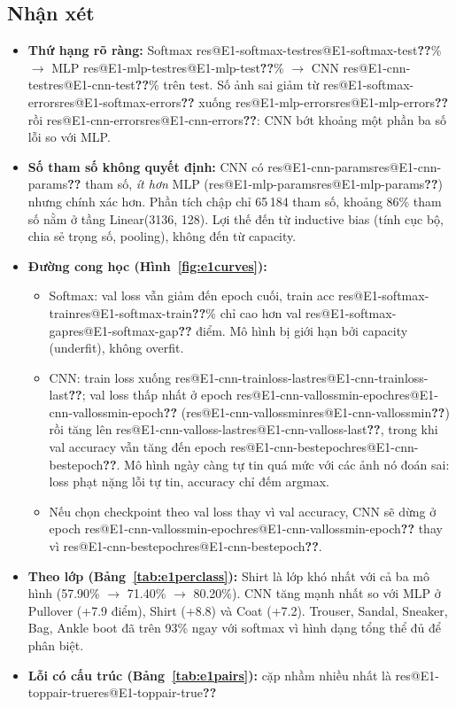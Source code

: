\documentclass[twoside,final]{hcmut-report}
\makeatletter
\newcommand{\res}[1]{\ifcsname res@#1\endcsname\csname res@#1\endcsname\else\textbf{??}\fi}
\makeatother
\begin{document}
\subsection{Nhận xét}
\begin{itemize}
  \item \textbf{Thứ hạng rõ ràng:} Softmax \res{E1-softmax-test}\% $\rightarrow$ MLP \res{E1-mlp-test}\% $\rightarrow$
        CNN \res{E1-cnn-test}\% trên test. Số ảnh sai giảm từ \res{E1-softmax-errors} xuống \res{E1-mlp-errors}
        rồi \res{E1-cnn-errors}: CNN bớt khoảng một phần ba số lỗi so với MLP.
  \item \textbf{Số tham số không quyết định:} CNN có \res{E1-cnn-params} tham số, \emph{ít hơn} MLP
        (\res{E1-mlp-params}) nhưng chính xác hơn. Phần tích chập chỉ 65\,184 tham số, khoảng 86\% tham số nằm ở
        tầng Linear(3136, 128). Lợi thế đến từ inductive bias (tính cục bộ, chia sẻ trọng số, pooling),
        không đến từ capacity.
  \item \textbf{Đường cong học (Hình~\ref{fig:e1curves}):}
        \begin{itemize}
          \item Softmax: val loss vẫn giảm đến epoch cuối, train acc \res{E1-softmax-train}\% chỉ cao hơn val
                \res{E1-softmax-gap} điểm. Mô hình bị giới hạn bởi capacity (underfit), không overfit.
          \item CNN: train loss xuống \res{E1-cnn-trainloss-last}; val loss thấp nhất ở epoch
                \res{E1-cnn-vallossmin-epoch} (\res{E1-cnn-vallossmin}) rồi tăng lên \res{E1-cnn-valloss-last},
                trong khi val accuracy vẫn tăng đến epoch \res{E1-cnn-bestepoch}. Mô hình ngày càng tự tin quá
                mức với các ảnh nó đoán sai: loss phạt nặng lỗi tự tin, accuracy chỉ đếm argmax.
          \item Nếu chọn checkpoint theo val loss thay vì val accuracy, CNN sẽ dừng ở epoch
                \res{E1-cnn-vallossmin-epoch} thay vì \res{E1-cnn-bestepoch}.
        \end{itemize}
  \item \textbf{Theo lớp (Bảng~\ref{tab:e1perclass}):} Shirt là lớp khó nhất với cả ba mô hình
        (57.90\% $\rightarrow$ 71.40\% $\rightarrow$ 80.20\%). CNN tăng mạnh nhất so với MLP ở Pullover
        (+7.9 điểm), Shirt (+8.8) và Coat (+7.2). Trouser, Sandal, Sneaker, Bag, Ankle boot đã trên 93\% ngay với
        softmax vì hình dạng tổng thể đủ để phân biệt.
  \item \textbf{Lỗi có cấu trúc (Bảng~\ref{tab:e1pairs}):} cặp nhầm nhiều nhất là \res{E1-toppair-true}

\end{itemize}
\end{document}
